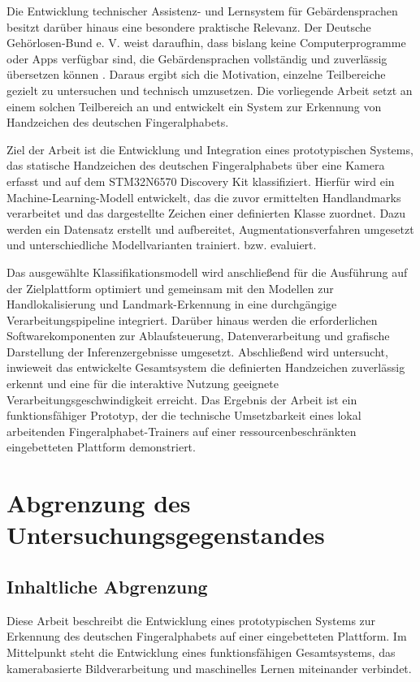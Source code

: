 Die Entwicklung technischer Assistenz- und Lernsystem für Gebärdensprachen besitzt darüber hinaus eine besondere praktische Relevanz. Der Deutsche Gehörlosen-Bund e. V. weist daraufhin, dass bislang keine Computerprogramme oder Apps verfügbar sind, die Gebärdensprachen vollständig und zuverlässig übersetzen können \cite{DeutscheGebaerdensprache}. Daraus ergibt sich die Motivation, einzelne Teilbereiche gezielt zu untersuchen und technisch umzusetzen. Die vorliegende Arbeit setzt an einem solchen Teilbereich an und entwickelt ein System zur Erkennung von Handzeichen des deutschen Fingeralphabets.

Ziel der Arbeit ist die Entwicklung und Integration eines prototypischen Systems, das statische Handzeichen des deutschen Fingeralphabets über eine Kamera erfasst und auf dem STM32N6570 Discovery Kit klassifiziert. Hierfür wird ein Machine-Learning-Modell entwickelt, das die zuvor ermittelten Handlandmarks verarbeitet und das dargestellte Zeichen einer definierten Klasse zuordnet. Dazu werden ein Datensatz erstellt und aufbereitet, Augmentationsverfahren umgesetzt und unterschiedliche Modellvarianten trainiert. bzw. evaluiert.

Das ausgewählte Klassifikationsmodell wird anschließend für die Ausführung auf der Zielplattform optimiert und gemeinsam mit den Modellen zur Handlokalisierung und Landmark-Erkennung in eine durchgängige Verarbeitungspipeline integriert. Darüber hinaus werden die erforderlichen Softwarekomponenten zur Ablaufsteuerung, Datenverarbeitung und grafische Darstellung der Inferenzergebnisse umgesetzt. Abschließend wird untersucht, inwieweit das entwickelte Gesamtsystem die definierten Handzeichen zuverlässig erkennt und eine für die interaktive Nutzung geeignete Verarbeitungsgeschwindigkeit erreicht. Das Ergebnis der Arbeit ist ein funktionsfähiger Prototyp, der die technische Umsetzbarkeit eines lokal arbeitenden Fingeralphabet-Trainers auf einer ressourcenbeschränkten eingebetteten Plattform demonstriert.

\section{Abgrenzung des Untersuchungsgegenstandes}
\subsection{Inhaltliche Abgrenzung}

Diese Arbeit beschreibt die Entwicklung eines prototypischen Systems zur Erkennung des deutschen Fingeralphabets auf einer eingebetteten Plattform. Im Mittelpunkt steht die Entwicklung eines funktionsfähigen Gesamtsystems, das kamerabasierte Bildverarbeitung und maschinelles Lernen miteinander verbindet.

